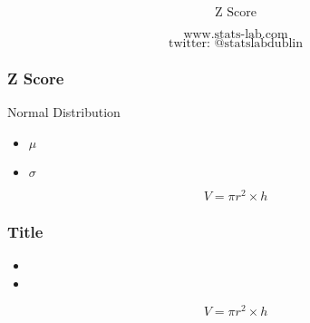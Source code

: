 \documentclass{beamer}
\begin{document}
\begin{frame}

{
\Huge
\[\mbox{Z Score} \]
}
{
\Large

\[\mbox{www.stats-lab.com} \]
\[ \mbox{twitter: @statslabdublin} \] 

}
\end{frame}
\begin{frame}
\frametitle{Z Score}
{
\Large
Normal Distribution
\begin{itemize}
\item $\mu$
\item $\sigma$
\end{itemize}
}
{
\Huge
\[V = \pi r^2  \times h \]
}
\end{frame}

\begin{frame}
\frametitle{Title}
{
\Large
\begin{itemize}
\item
\item
\end{itemize}
}
{
\Huge
\[V = \pi r^2  \times h \]
}
\end{frame}
\end{document}
